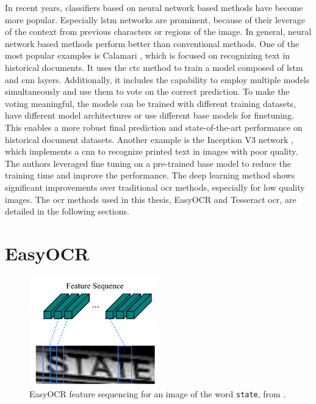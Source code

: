 In recent years, classifiers based on neural network based methods \cite{ocr_survey_lstms_2013} have become more popular.
Especially \gls{lstm} networks are prominent, because of their leverage of the context from previous characters or regions of the image.
In general, neural network based methods perform better than conventional methods.
One of the most popular examples is Calamari \cite{ocr_calamari_2018}, which is focused on recognizing text in historical documents.
It uses the \gls{ctc} method to train a model composed of \gls{lstm} and \gls{cnn} layers.
Additionally, it includes the capability to employ multiple models simultaneously and use them to vote on the correct prediction.
To make the voting meaningful, the models can be trained with different training datasets, have different model architectures or use different base models for finetuning.
This enables a more robust final prediction and state-of-the-art performance on historical document datasets.
Another example is the Inception V3 network \cite{ocr_improved_deep_2018}, which implements a \gls{cnn} to recognize printed text in images with poor quality.
The authors leveraged fine tuning on a pre-trained base model to reduce the training time and improve the performance.
The deep learning method shows significant improvements over traditional \gls{ocr} methods, especially for low quality images.
The \gls{ocr} methods used in this thesis, EasyOCR and Tesseract \gls{ocr}, are detailed in the following sections.

\section{EasyOCR}
\label{subsec:easyocr}

\begin{figure}[h!]
    \centering
    \includegraphics[width=0.5\textwidth]{../images/external/crnn_features.png}
    \caption{EasyOCR feature sequencing for an image of the word \texttt{state}, from \cite{crnn_2015}.}
    \label{fig:easyocr_features}
\end{figure}

